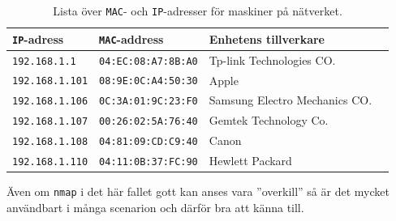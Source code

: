 \begin{table}[]
  \centering
  \caption{Lista över \texttt{MAC}- och \texttt{IP}-adresser för maskiner på
           nätverket.}
  \label{table:network}
  \begin{tabular}{@{}llll@{}}
    \toprule
    \texttt{IP}-adress     & \texttt{MAC}-address       & Enhetens tillverkare          \\ \midrule
    \texttt{192.168.1.1}   & \texttt{04:EC:08:A7:8B:A0} & Tp-link Technologies CO.      \\
    \texttt{192.168.1.101} & \texttt{08:9E:0C:A4:50:30} & Apple                         \\
    \texttt{192.168.1.106} & \texttt{0C:3A:01:9C:23:F0} & Samsung Electro Mechanics CO. \\
    \texttt{192.168.1.107} & \texttt{00:26:02:5A:76:40} & Gemtek Technology Co.         \\
    \texttt{192.168.1.108} & \texttt{04:81:09:CD:C9:40} & Canon                         \\
    \texttt{192.168.1.110} & \texttt{04:11:0B:37:FC:90} & Hewlett Packard               \\ \bottomrule
  \end{tabular}
\end{table}


Även om \texttt{nmap} i det här fallet gott kan anses vara ''overkill'' så är
det mycket användbart i många scenarion och därför bra att känna till.

